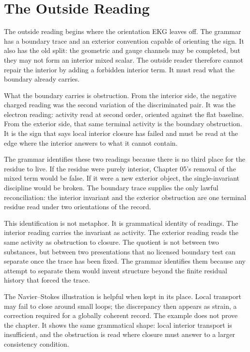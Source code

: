 \section{The Outside Reading}

The outside reading begins where the orientation EKG leaves off. The grammar
has a boundary trace and an exterior convention capable of orienting the
sign. It also has the old split: the geometric and gauge channels may be
completed, but they may not form an interior mixed scalar. The outside reader
therefore cannot repair the interior by adding a forbidden interior term. It
must read what the boundary already carries.

What the boundary carries is obstruction. From the interior side, the
negative charged reading was the second variation of the discriminated pair.
It was the electron reading: activity read at second order, oriented against
the flat baseline. From the exterior side, that same terminal activity is the
boundary obstruction. It is the sign that says local interior closure has
failed and must be read at the edge where the interior answers to what it
cannot contain.

The grammar identifies these two readings because there is no third place
for the residue to live. If the residue were purely interior, Chapter 05's
removal of the mixed term would be false. If it were a new exterior object,
the single-invariant discipline would be broken. The boundary trace supplies
the only lawful reconciliation: the interior invariant and the exterior
obstruction are one terminal residue read under two orientations of the
record.

This identification is not metaphor. It is grammatical identity of readings.
The interior reading carries the invariant as activity. The exterior reading
reads the same activity as obstruction to closure. The quotient is not between
two substances, but between two presentations that no licensed boundary test
can separate once the trace has been fixed. The grammar identifies them
because any attempt to separate them would invent structure beyond the finite
residual history that forced the trace.

The Navier--Stokes illustration is helpful when kept in its place. Local
transport may fail to close around small loops; the discrepancy then appears
as strain, a correction required for a globally coherent record. The example
does not prove the chapter. It shows the same grammatical shape: local
interior transport is insufficient, and the obstruction is read where closure
must answer to a larger consistency condition.

